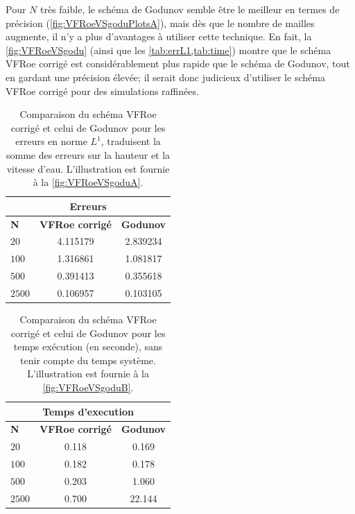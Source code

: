 \documentclass[
	french,
	11pt, %
]{fphw}
\newcommand{\tabhead}[1]{{\bfseries#1}}
\begin{document}
\noindent Pour $N$ très faible, le schéma de Godunov semble être le meilleur en termes de précision (\cref{fig:VFRoeVSgoduPlotsA}), mais dès que le nombre de mailles augmente, il n'y a plus d'avantages à utiliser cette technique. En fait, la \cref{fig:VFRoeVSgodu} (ainsi que les \cref{tab:errL1,tab:time}) montre que le schéma VFRoe corrigé est considérablement plus rapide que le schéma de Godunov, tout en gardant une précision élevée; il serait donc judicieux d'utiliser le schéma VFRoe corrigé pour des simulations raffinées.

\begin{table}[h!]
    \centering
    \begin{tabular}{l c c}
		\multicolumn{3}{c}{\tabhead{Erreurs}} \\
        \toprule
        \tabhead{N} & \tabhead{VFRoe corrigé} & \tabhead{Godunov} \\
        \midrule
        \tabhead{$20$} & 4.115179 & 2.839234 \\
        \tabhead{$100$} & 1.316861 & 1.081817 \\
        \tabhead{$500$} & 0.391413 & 0.355618 \\
        \tabhead{$2500$} & 0.106957 & 0.103105 \\
        \bottomrule
    \end{tabular}
	\caption{Comparaison du schéma VFRoe corrigé et celui de Godunov pour les erreurs en norme $L^1$, traduisent la somme des erreurs sur la hauteur et la vitesse d'eau. L'illustration est fournie à la \cref{fig:VFRoeVSgoduA}.}
	\label{tab:errL1}
\end{table}

\begin{table}[h!]
    \centering
    \begin{tabular}{l c c}
		\multicolumn{3}{c}{\tabhead{Temps d'execution}} \\
		\toprule
        \tabhead{N} & \tabhead{VFRoe corrigé} & \tabhead{Godunov} \\
        \midrule
        \tabhead{$20$} & 0.118 & 0.169 \\
        \tabhead{$100$} & 0.182 & 0.178 \\
        \tabhead{$500$} & 0.203 & 1.060 \\
        \tabhead{$2500$} & 0.700 & 22.144 \\
        \bottomrule
    \end{tabular}
	\caption{Comparaison du schéma VFRoe corrigé et celui de Godunov pour les temps exécution (en seconde), sans tenir compte du temps système. L'illustration est fournie à la \cref{fig:VFRoeVSgoduB}.}
	\label{tab:time}
\end{table}
\end{document}
